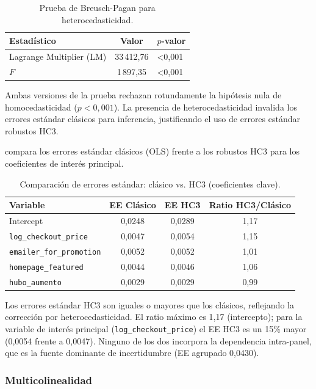 \documentclass[doc, a4paper, biblatex, floatsintext, longtable, babel]{apa7}
\begin{document}
\begin{table}[!htbp]
\centering
\caption{Prueba de Breusch-Pagan para heterocedasticidad.}
\label{tab:breusch_pagan}
\begin{tabular}{lcp{4.5cm}}
\toprule
Estad\'istico & Valor & $p$-valor \\
\midrule
Lagrange Multiplier (LM) & 33\,412,76 & <0,001 \\
$F$ & 1\,897,35 & <0,001 \\
\bottomrule
\end{tabular}
\end{table}

Ambas versiones de la prueba rechazan rotundamente la hip\'otesis nula de homocedasticidad ($p < 0,001$). La presencia de heterocedasticidad invalida los errores est\'andar cl\'asicos para inferencia, justificando el uso de errores est\'andar robustos HC3.

 compara los errores est\'andar cl\'asicos (OLS) frente a los robustos HC3 para los coeficientes de inter\'es principal.

\begin{table}[!htbp]
\centering
\caption{Comparaci\'on de errores est\'andar: cl\'asico vs. HC3 (coeficientes clave).}
\label{tab:se_comparacion}
\begin{tabular}{lccc}
\toprule
Variable & EE Cl\'asico & EE HC3 & Ratio HC3/Cl\'asico \\
\midrule
Intercept & 0,0248 & 0,0289 & 1,17 \\
\texttt{log\_checkout\_price} & 0,0047 & 0,0054 & 1,15 \\
\texttt{emailer\_for\_promotion} & 0,0052 & 0,0052 & 1,01 \\
\texttt{homepage\_featured} & 0,0044 & 0,0046 & 1,06 \\
\texttt{hubo\_aumento} & 0,0029 & 0,0029 & 0,99 \\
\bottomrule
\end{tabular}
\end{table}

Los errores est\'andar HC3 son iguales o mayores que los cl\'asicos, reflejando la correcci\'on por heterocedasticidad. El ratio m\'aximo es 1,17 (intercepto); para la variable de inter\'es principal (\texttt{log\_checkout\_price}) el EE HC3 es un 15\% mayor (0,0054 frente a 0,0047). Ninguno de los dos incorpora la dependencia intra-panel, que es la fuente dominante de incertidumbre (EE agrupado 0,0430).

\subsubsection{Multicolinealidad}
\label{subsec:multicolinealidad}
\end{document}
